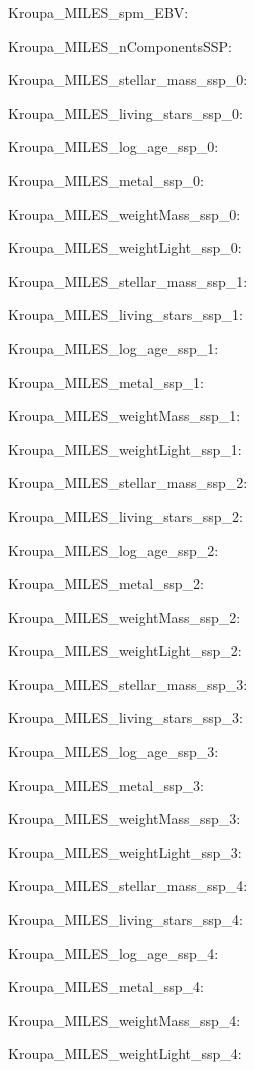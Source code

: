 \item Kroupa\_MILES\_spm\_EBV: 
\item Kroupa\_MILES\_nComponentsSSP: 
\item Kroupa\_MILES\_stellar\_mass\_ssp\_0: 
\item Kroupa\_MILES\_living\_stars\_ssp\_0: 
\item Kroupa\_MILES\_log\_age\_ssp\_0: 
\item Kroupa\_MILES\_metal\_ssp\_0: 
\item Kroupa\_MILES\_weightMass\_ssp\_0: 
\item Kroupa\_MILES\_weightLight\_ssp\_0: 
\item Kroupa\_MILES\_stellar\_mass\_ssp\_1: 
\item Kroupa\_MILES\_living\_stars\_ssp\_1: 
\item Kroupa\_MILES\_log\_age\_ssp\_1: 
\item Kroupa\_MILES\_metal\_ssp\_1: 
\item Kroupa\_MILES\_weightMass\_ssp\_1: 
\item Kroupa\_MILES\_weightLight\_ssp\_1: 
\item Kroupa\_MILES\_stellar\_mass\_ssp\_2: 
\item Kroupa\_MILES\_living\_stars\_ssp\_2: 
\item Kroupa\_MILES\_log\_age\_ssp\_2: 
\item Kroupa\_MILES\_metal\_ssp\_2: 
\item Kroupa\_MILES\_weightMass\_ssp\_2: 
\item Kroupa\_MILES\_weightLight\_ssp\_2: 
\item Kroupa\_MILES\_stellar\_mass\_ssp\_3: 
\item Kroupa\_MILES\_living\_stars\_ssp\_3: 
\item Kroupa\_MILES\_log\_age\_ssp\_3: 
\item Kroupa\_MILES\_metal\_ssp\_3: 
\item Kroupa\_MILES\_weightMass\_ssp\_3: 
\item Kroupa\_MILES\_weightLight\_ssp\_3: 
\item Kroupa\_MILES\_stellar\_mass\_ssp\_4: 
\item Kroupa\_MILES\_living\_stars\_ssp\_4: 
\item Kroupa\_MILES\_log\_age\_ssp\_4: 
\item Kroupa\_MILES\_metal\_ssp\_4: 
\item Kroupa\_MILES\_weightMass\_ssp\_4: 
\item Kroupa\_MILES\_weightLight\_ssp\_4: 
